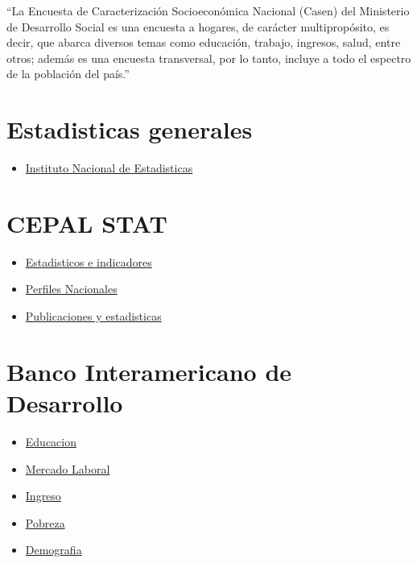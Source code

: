 \documentclass[]{book}
\providecommand{\tightlist}{%
  \setlength{\itemsep}{0pt}\setlength{\parskip}{0pt}}
\begin{document}
``La Encuesta de Caracterización Socioeconómica Nacional (Casen) del Ministerio de Desarrollo Social es una encuesta a hogares, de carácter multipropósito, es decir, que abarca diversos temas como educación, trabajo, ingresos, salud, entre otros; además es una encuesta transversal, por lo tanto, incluye a todo el espectro de la población del país.''

\hypertarget{estadisticas-generales}{%
\section{Estadisticas generales}\label{estadisticas-generales}}

\begin{itemize}
\tightlist
\item
  \href{www.ine.cl}{Instituto Nacional de Estadisticas}
\end{itemize}

\hypertarget{cepal-stat}{%
\section{CEPAL STAT}\label{cepal-stat}}

\begin{itemize}
\tightlist
\item
  \href{http://estadisticas.cepal.org/cepalstat/WEB_CEPALSTAT/estadisticasIndicadores.asp}{Estadisticos e indicadores}
\item
  \href{http://estadisticas.cepal.org/cepalstat/WEB_CEPALSTAT/estadisticasIndicadores.asp}{Perfiles Nacionales}
\item
  \href{http://estadisticas.cepal.org/cepalstat/WEB_CEPALSTAT/PublicacionesEstadisticas.asp}{Publicaciones y estadisticas}
\end{itemize}

\hypertarget{banco-interamericano-de-desarrollo}{%
\section{Banco Interamericano de Desarrollo}\label{banco-interamericano-de-desarrollo}}

\begin{itemize}
\tightlist
\item
  \href{http://www.iadb.org/en/research-and-data//tables,6882.html?indicator=2}{Educacion}
\item
  \href{http://www.iadb.org/en/research-and-data//tables,6882.html?indicator=2}{Mercado Laboral}
\item
  \href{http://www.iadb.org/es/investigacion-y-datos//tablas,6882.html?indicator=4}{Ingreso}
\item
  \href{http://www.iadb.org/es/investigacion-y-datos//pobreza,7526.html}{Pobreza}
\item
  \href{http://www.iadb.org/es/investigacion-y-datos//tablas,6882.html?indicator=1}{Demografia}
\end{itemize}
\end{document}
